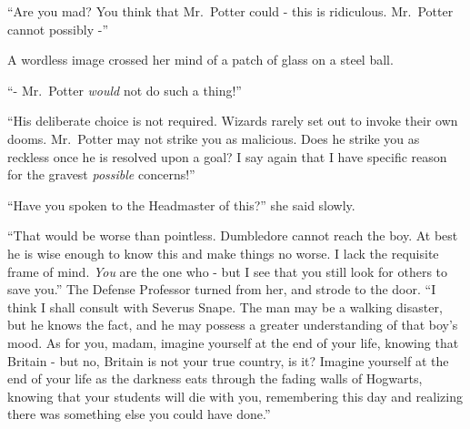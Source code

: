 ``Are you mad? You think that Mr.~Potter could - this is ridiculous.
Mr.~Potter cannot possibly -''

A wordless image crossed her mind of a patch of glass on a steel ball.

``- Mr.~Potter \emph{would} not do such a thing!''

``His deliberate choice is not required. Wizards rarely set out to
invoke their own dooms. Mr.~Potter may not strike you as malicious. Does
he strike you as reckless once he is resolved upon a goal? I say again
that I have specific reason for the gravest \emph{possible} concerns!''

``Have you spoken to the Headmaster of this?'' she said slowly.

``That would be worse than pointless. Dumbledore cannot reach the boy.
At best he is wise enough to know this and make things no worse. I lack
the requisite frame of mind. \emph{You} are the one who - but I see that
you still look for others to save you.'' The Defense Professor turned
from her, and strode to the door. ``I think I shall consult with Severus
Snape. The man may be a walking disaster, but he knows the fact, and he
may possess a greater understanding of that boy's mood. As for you,
madam, imagine yourself at the end of your life, knowing that Britain -
but no, Britain is not your true country, is it? Imagine yourself at the
end of your life as the darkness eats through the fading walls of
Hogwarts, knowing that your students will die with you, remembering this
day and realizing there was something else you could have done.''
